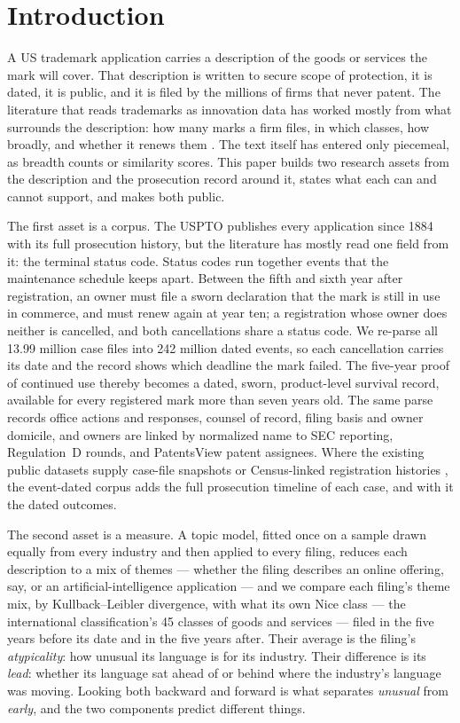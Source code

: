 \section{Introduction}\label{sec:intro}

A US trademark application carries a description of the goods or services
the mark will cover. That description is written to secure scope of
protection, it is dated, it is public, and it is filed by the millions of
firms that never patent. The literature that reads trademarks as
innovation data has worked mostly from what surrounds the description:
how many marks a firm files, in which classes, how broadly, and whether
it renews them \citep{Castaldi2020, Flikkema2019, Dinlersoz2018}. The
text itself has entered only piecemeal, as breadth counts or similarity
scores. This paper builds two research assets from the description and
the prosecution record around it, states what each can and cannot
support, and makes both public.

The first asset is a corpus. The USPTO publishes every application since
1884 with its full prosecution history, but the literature has mostly
read one field from it: the terminal status code. Status codes run
together events that the maintenance schedule keeps apart. Between the
fifth and sixth year after registration, an owner must file a sworn
declaration that the mark is still in use in commerce, and must renew
again at year ten; a registration whose owner does neither is cancelled,
and both cancellations share a status code. We re-parse all 13.99 million
case files into 242 million dated events, so each cancellation carries
its date and the record shows which deadline the mark failed. The
five-year proof of continued use thereby becomes a dated, sworn,
product-level survival record, available for every registered mark more
than seven years old. The same parse records office actions and
responses, counsel of record, filing basis and owner domicile, and
owners are linked by normalized name to SEC reporting, Regulation~D
rounds, and PatentsView patent assignees. Where the existing public
datasets supply case-file snapshots \citep{Graham2013} or Census-linked
registration histories \citep{Dinlersoz2018}, the event-dated corpus
adds the full prosecution timeline of each case, and with it the dated
outcomes.

The second asset is a measure. A topic model, fitted once on a sample
drawn equally from every industry and then applied to every filing,
reduces each description to a mix of themes --- whether the
filing describes an online offering, say, or an artificial-intelligence
application --- and we compare each filing's theme mix, by
Kullback--Leibler divergence, with what its own Nice class --- the international classification's 45
classes of goods and services --- filed in the five years before its
date and in the five years after. Their average is
the filing's \emph{atypicality}: how unusual its language is for its
industry. Their difference is its \emph{lead}: whether its language sat
ahead of or behind where the industry's language was moving. Looking
both backward and forward is what separates \emph{unusual} from
\emph{early}, and the two components predict different things.

